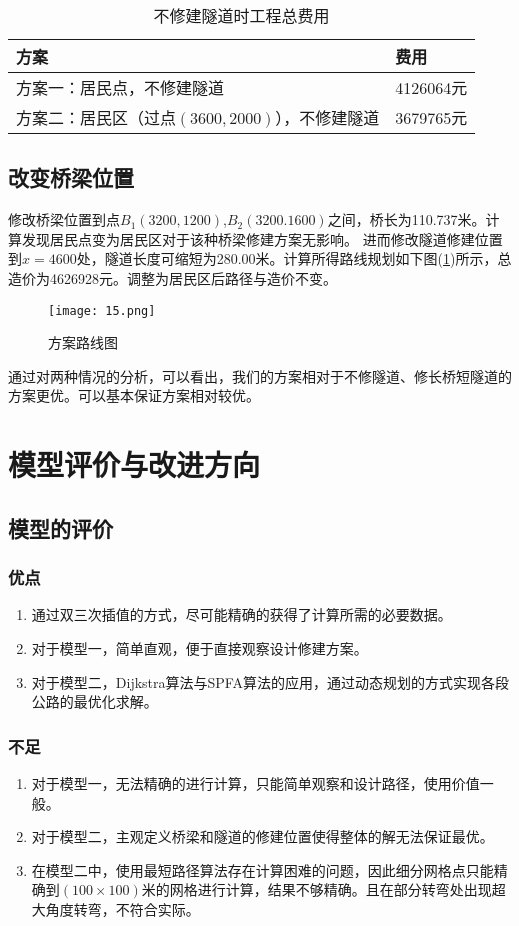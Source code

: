 \documentclass[bwprint]{cumcmthesis}
\begin{document}
\begin{table}[h]
\centering
\caption{不修建隧道时工程总费用}
\label{不修建隧道时工程总费用}
\begin{tabular}{ll}
\toprule
方案 & 费用\\
\midrule
方案一：居民点，不修建隧道 & 4126064元\\
方案二：居民区（过点$(3600,2000)$），不修建隧道 & 3679765元\\
\bottomrule
\end{tabular}
\end{table}

\subsection{改变桥梁位置}
修改桥梁位置到点$B_1(3200,1200)$,$B_2(3200.1600)$之间，桥长为110.737米。计算发现居民点变为居民区对于该种桥梁修建方案无影响。
进而修改隧道修建位置到$x = 4600$处，隧道长度可缩短为280.00米。计算所得路线规划如下图(\ref{方案路线图})所示，总造价为4626928元。调整为居民区后路径与造价不变。 

\begin{figure}[h]
\small
\centering
\texttt{[image: 15.png]}
\caption{方案路线图} 
\label{方案路线图}
\end{figure}

通过对两种情况的分析，可以看出，我们的方案相对于不修隧道、修长桥短隧道的方案更优。可以基本保证方案相对较优。

\section{模型评价与改进方向}
\subsection{模型的评价}
\subsubsection{优点}
\begin{enumerate}
	\item 通过双三次插值的方式，尽可能精确的获得了计算所需的必要数据。
	\item 对于模型一，简单直观，便于直接观察设计修建方案。
	\item 对于模型二，Dijkstra算法与SPFA算法的应用，通过动态规划的方式实现各段公路的最优化求解。
\end{enumerate}
\subsubsection{不足}
\begin{enumerate}
	\item 对于模型一，无法精确的进行计算，只能简单观察和设计路径，使用价值一般。
	\item 对于模型二，主观定义桥梁和隧道的修建位置使得整体的解无法保证最优。
	\item 在模型二中，使用最短路径算法存在计算困难的问题，因此细分网格点只能精确到$(100\times100)$米的网格进行计算，结果不够精确。且在部分转弯处出现超大角度转弯，不符合实际。
\end{enumerate}
\end{document}
